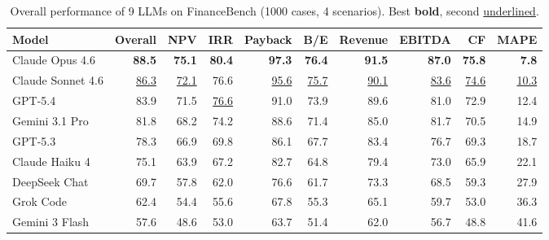 \begin{table}[t]
\centering
\small
\caption{Overall performance of 9 LLMs on FinanceBench (1000 cases, 4 scenarios). Best \textbf{bold}, second \underline{underlined}.}
\label{tab:overall_performance}
\begin{tabular}{lrrrrrrrrr}
\toprule
Model & Overall & NPV & IRR & Payback & B/E & Revenue & EBITDA & CF & MAPE \\
\midrule
Claude Opus 4.6 & \textbf{88.5} & \textbf{75.1} & \textbf{80.4} & \textbf{97.3} & \textbf{76.4} & \textbf{91.5} & \textbf{87.0} & \textbf{75.8} & \textbf{7.8} \\
Claude Sonnet 4.6 & \underline{86.3} & \underline{72.1} & 76.6 & \underline{95.6} & \underline{75.7} & \underline{90.1} & \underline{83.6} & \underline{74.6} & \underline{10.3} \\
GPT-5.4 & 83.9 & 71.5 & \underline{76.6} & 91.0 & 73.9 & 89.6 & 81.0 & 72.9 & 12.4 \\
Gemini 3.1 Pro & 81.8 & 68.2 & 74.2 & 88.6 & 71.4 & 85.0 & 81.7 & 70.5 & 14.9 \\
GPT-5.3 & 78.3 & 66.9 & 69.8 & 86.1 & 67.7 & 83.4 & 76.7 & 69.3 & 18.7 \\
Claude Haiku 4 & 75.1 & 63.9 & 67.2 & 82.7 & 64.8 & 79.4 & 73.0 & 65.9 & 22.1 \\
DeepSeek Chat & 69.7 & 57.8 & 62.0 & 76.6 & 61.7 & 73.3 & 68.5 & 59.3 & 27.9 \\
Grok Code & 62.4 & 54.4 & 55.6 & 67.8 & 55.3 & 65.1 & 59.7 & 53.0 & 36.3 \\
Gemini 3 Flash & 57.6 & 48.6 & 53.0 & 63.7 & 51.4 & 62.0 & 56.7 & 48.8 & 41.6 \\
\bottomrule
\end{tabular}
\end{table}